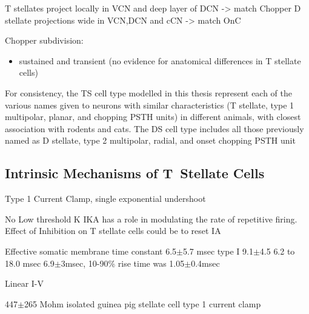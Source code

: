 T stellates project locally in VCN and deep layer of DCN -> match Chopper \citep{RhodeOertelEtAl:1983,SmithRhode:1989}
D stellate projections wide in VCN,DCN and cCN -> match OnC  \citep{SmithRhode:1989}



Chopper subdivision:
\begin{itemize}
\item sustained and transient (no evidence for anatomical differences in T stellate cells)
\end{itemize}




  For consistency, the TS cell type modelled in this thesis represent each of the
  various names given to neurons with similar characteristics (T stellate, type 1
  multipolar, planar, and chopping PSTH units) in different animals, with closest
  association with rodents and cats. The DS cell type includes all those previously named as D stellate, type 2
  multipolar, radial, and onset chopping PSTH unit



 \subsection{Intrinsic Mechanisms of T~Stellate Cells}\label{sec:intr-mech-tstellate} %


Type 1 Current Clamp, single exponential undershoot
      \citep{FengKuwadaEtAl:1994,ManisMarx:1991,WuOertel:1984}         
\citep{FujinoOertel:2001,FerragamoGoldingEtAl:1998a} 



\citep{RothmanManis:2003,RothmanManis:2003a,RothmanManis:2003b,Rothman:1999}


No Low threshold
K \citep{ManisMarx:1991} 
IKA has a role in modulating the rate of repetitive
firing.  
Effect of Inhibition on T stellate cells could be to reset IA \citep{RothmanManis:2003b}                       

Effective somatic membrane time constant 6.5{$\pm$}5.7 msec \citep{ManisMarx:1991}
type I 9.1{$\pm$}4.5 \citep{ManisMarx:1991} 
6.2 to 18.0 msec
\citep{FengKuwadaEtAl:1994} 6.9{$\pm$}3msec, 10-90\% rise time was
         1.05{$\pm$}0.4msec \citep{IsaacsonWalmsley:1995}           

Linear I-V                       \citep{ManisMarx:1991}                     

447{$\pm$}265 Mohm isolated guinea pig stellate cell type 1 current clamp
\citep{ManisMarx:1991} 

